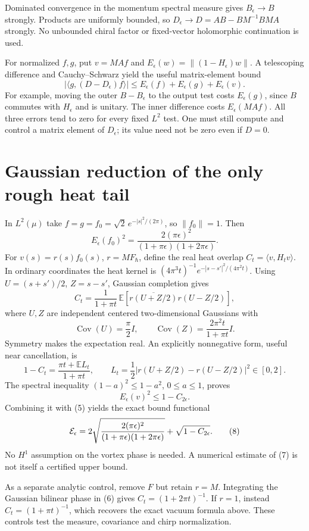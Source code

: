 \documentclass[11pt,a4paper]{article}
\newcommand{\F}{F_\hbar}
\begin{document}
Dominated convergence in the momentum spectral measure gives
$B_\epsilon\to B$ strongly. Products are uniformly bounded, so
$D_\epsilon\to D=AB-BM^{-1}BMA$ strongly. No unbounded chiral
factor or fixed-vector holomorphic continuation is used.

For normalized $f,g$, put $v=MAf$ and
$E_\epsilon(w)=\|(1-H_\epsilon)w\|$. A telescoping difference and
Cauchy--Schwarz yield the useful matrix-element bound
\[
 |\langle g,(D-D_\epsilon)f\rangle|
 \leq E_\epsilon(f)+E_\epsilon(g)+E_\epsilon(v). \tag{5}
\]
For example, moving the outer $B-B_\epsilon$ to the output test
costs $E_\epsilon(g)$, since $B$ commutes with $H_\epsilon$ and is
unitary. The inner difference costs $E_\epsilon(MAf)$.
All three errors tend to zero for every fixed $L^2$ test.
One must still compute and control a matrix element of $D_\epsilon$;
its value need not be zero even if $D=0$.

\newpage
\section{Gaussian reduction of the only rough heat tail}
In $L^2(\mu)$ take $f=g=f_0=\sqrt2\,e^{-|s|^2/(2\pi)}$,
so $\|f_0\|=1$. Then
\[
 E_\epsilon(f_0)^2
 =\frac{2(\pi\epsilon)^2}{(1+\pi\epsilon)(1+2\pi\epsilon)}.
\]
For $v(s)=r(s)f_0(s)$, $r=M\F$, define the real heat overlap
$C_t=\langle v,H_t v\rangle$. In ordinary coordinates the heat
kernel is $(4\pi^3t)^{-1}e^{-|s-s'|^2/(4\pi^2t)}$.
Using $U=(s+s')/2$, $Z=s-s'$, Gaussian completion gives
\[
 C_t=\frac1{1+\pi t}\,
 \mathbb E\!\left[
 \overline{r(U+Z/2)}r(U-Z/2)\right], \tag{6}
\]
where $U,Z$ are independent centered two-dimensional Gaussians with
\[
 \operatorname{Cov}(U)=\frac\pi2 I,\qquad
 \operatorname{Cov}(Z)=\frac{2\pi^2t}{1+\pi t}I .
\]
Symmetry makes the expectation real. An explicitly nonnegative
form, useful near cancellation, is
\[
 1-C_t=\frac{\pi t+\mathbb E L_t}{1+\pi t},\qquad
 L_t=\frac12|r(U+Z/2)-r(U-Z/2)|^2\in[0,2]. \tag{7}
\]
The spectral inequality $(1-a)^2\leq1-a^2$, $0\leq a\leq1$, proves
\[
 E_\epsilon(v)^2\leq1-C_{2\epsilon}.
\]
Combining it with (5) yields the exact bound functional
\[
 {\cal E}_\epsilon=
 2\sqrt{\frac{2(\pi\epsilon)^2}
 {(1+\pi\epsilon)(1+2\pi\epsilon)}}+\sqrt{1-C_{2\epsilon}}. \tag{8}
\]
No $H^1$ assumption on the vortex phase is needed.
A numerical estimate of (7) is not itself a certified upper bound.

As a separate analytic control, remove $F$ but retain $r=M$.
Integrating the Gaussian bilinear phase in (6) gives
$C_t=(1+2\pi t)^{-1}$. If $r=1$, instead
$C_t=(1+\pi t)^{-1}$, which recovers the exact vacuum formula above.
These controls test the measure, covariance and chirp normalization.
\end{document}

